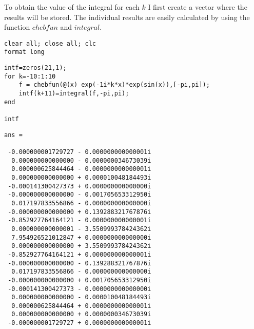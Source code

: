 \begin{solution}
To obtain the value of the integral for each $k$ I first create a vector where the results will be stored. The individual results are easily calculated by using the function $chebfun$ and $integral$.
\begin{verbatim}
clear all; close all; clc
format long
\end{verbatim}
\begin{verbatim}
intf=zeros(21,1);
for k=-10:1:10
    f = chebfun(@(x) exp(-1i*k*x)*exp(sin(x)),[-pi,pi]);
    intf(k+11)=integral(f,-pi,pi);
end

intf
\end{verbatim}

\begin{verbatim}
ans =

 -0.000000001729727 - 0.000000000000001i
  0.000000000000000 - 0.000000034673039i
  0.000000625844464 - 0.000000000000001i
  0.000000000000000 + 0.000010048184493i
 -0.000141300427373 + 0.000000000000000i
 -0.000000000000000 - 0.001705653312950i
  0.017197833556866 - 0.000000000000000i
 -0.000000000000000 + 0.139288321767876i
 -0.852927764164121 - 0.000000000000001i
  0.000000000000001 - 3.550999378424362i
  7.954926521012847 + 0.000000000000000i
  0.000000000000000 + 3.550999378424362i
 -0.852927764164121 + 0.000000000000001i
 -0.000000000000000 - 0.139288321767876i
  0.017197833556866 - 0.000000000000000i
 -0.000000000000000 + 0.001705653312950i
 -0.000141300427373 - 0.000000000000000i
  0.000000000000000 - 0.000010048184493i
  0.000000625844464 + 0.000000000000001i
  0.000000000000000 + 0.000000034673039i
 -0.000000001729727 + 0.000000000000001i

\end{verbatim}
\end{solution}
